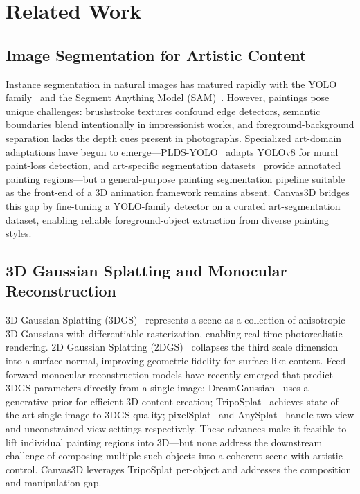 \section{Related Work}
\label{sec:related}

\subsection{Image Segmentation for Artistic Content}

Instance segmentation in natural images has matured rapidly with the YOLO
family~\cite{jocher2023yolov8,wang2024yolov9,wang2024yolov10,tian2025yolov12}
and the Segment Anything Model
(SAM)~\cite{kirillov2023sam,ravi2024sam2}. However, paintings pose unique
challenges: brushstroke textures confound edge detectors, semantic boundaries
blend intentionally in impressionist works, and foreground-background separation
lacks the depth cues present in photographs. Specialized art-domain
adaptations have begun to emerge---PLDS-YOLO~\cite{chen2025pldsyolo} adapts
YOLOv8 for mural paint-loss detection, and art-specific segmentation
datasets~\cite{saleh2016metric} provide annotated painting regions---but a
general-purpose painting segmentation pipeline suitable as the front-end of
a 3D animation framework remains absent. Canvas3D bridges this gap by
fine-tuning a YOLO-family detector on a curated art-segmentation dataset,
enabling reliable foreground-object extraction from diverse painting styles.

\subsection{3D Gaussian Splatting and Monocular Reconstruction}

3D Gaussian Splatting (3DGS)~\cite{kerbl20233dgs} represents a scene as a
collection of anisotropic 3D Gaussians with differentiable rasterization,
enabling real-time photorealistic rendering. 2D Gaussian Splatting
(2DGS)~\cite{huang20242dgs} collapses the third scale dimension into a surface
normal, improving geometric fidelity for surface-like content.
Feed-forward monocular reconstruction models have recently emerged that
predict 3DGS parameters directly from a single image:
DreamGaussian~\cite{tang2024dreamgaussian} uses a generative prior for
efficient 3D content creation; TripoSplat~\cite{wang2024triposplat} achieves
state-of-the-art single-image-to-3DGS quality; pixelSplat~\cite{charatan2024pixelsplat}
and AnySplat~\cite{jiang2025anysplat} handle two-view and unconstrained-view
settings respectively. These advances make it feasible to lift individual
painting regions into 3D---but none address the downstream challenge of
composing multiple such objects into a coherent scene with artistic control.
Canvas3D leverages TripoSplat per-object and addresses the composition and
manipulation gap.

